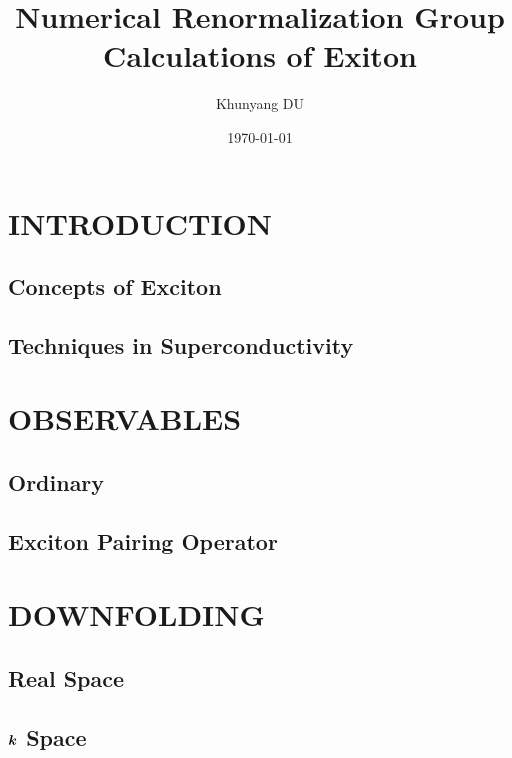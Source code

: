 \documentclass{article}
\title{Numerical Renormalization Group Calculations of Exiton}
\author{Khunyang DU}
\date{\today}
\begin{document}
	\maketitle
	\tableofcontents
	\section{INTRODUCTION}
	\subsection{Concepts of Exciton}
	\subsection{Techniques in Superconductivity}
	\section{OBSERVABLES}
	\subsection{Ordinary}
	\subsection{Exciton Pairing Operator}
	\section{DOWNFOLDING}
	\subsection{Real Space}
	\subsection{$\vb*{k}$ Space}
	
\end{document}
